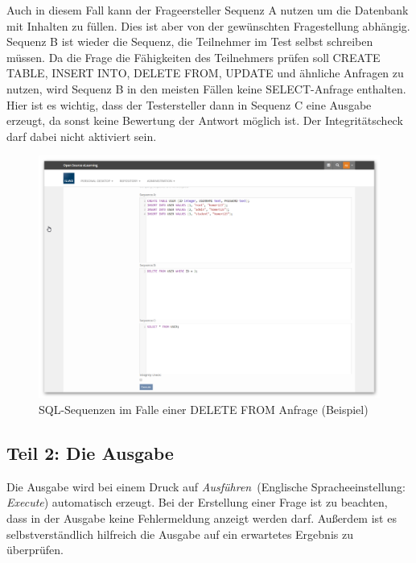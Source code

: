         Auch in diesem Fall kann der Frageersteller Sequenz A nutzen um die Datenbank mit Inhalten zu füllen. Dies ist aber von der gewünschten Fragestellung abhängig. Sequenz B ist wieder die Sequenz, die Teilnehmer im Test selbst schreiben müssen. Da die Frage die Fähigkeiten des Teilnehmers prüfen soll CREATE TABLE, INSERT INTO, DELETE FROM, UPDATE und ähnliche Anfragen zu nutzen, wird Sequenz B in den meisten Fällen keine SELECT-Anfrage enthalten. Hier ist es wichtig, dass der Testersteller dann in Sequenz C eine Ausgabe erzeugt, da sonst keine Bewertung der Antwort möglich ist. Der Integritätscheck darf dabei nicht aktiviert sein.
        
        \begin{figure}[H]
            \begin{center}
                \includegraphics[page=1, width=0.7\paperwidth, trim=4 4 4 4, clip]{fig/Beispiel-SQL-Sequenzen-bei-DELETE-FROM-Anfrage.png} 
                \caption{SQL-Sequenzen im Falle einer DELETE FROM Anfrage (Beispiel)}
                \label{fig:beispiel-sql-sequenzen-bei-delete-from-anfrage}
            \end{center}
        \end{figure}
        
\subsection{Teil 2: Die Ausgabe}
            
        Die Ausgabe wird bei einem Druck auf \glqq\textit{Ausführen}\grqq\ (Englische Spracheeinstellung: \glqq\textit{Execute}\grqq ) automatisch erzeugt. Bei der Erstellung einer Frage ist zu beachten, dass in der Ausgabe keine Fehlermeldung anzeigt werden darf. Außerdem ist es selbstverständlich hilfreich die Ausgabe auf ein erwartetes Ergebnis zu überprüfen.
        
